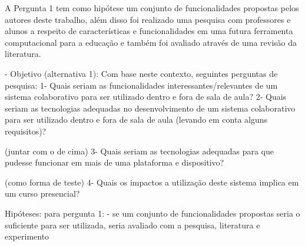 


A Pergunta 1 tem como hipótese um conjunto de funcionalidades propostas pelos autores deste trabalho, além disso foi realizado uma pesquisa com professores e alunos a respeito de características e funcionalidades em uma futura ferramenta computacional para a educação e também foi avaliado através de uma revisão da literatura.

- Objetivo (alternativa 1):
                Com base neste contexto, seguintes perguntas de pesquisa:
                    1- Quais seriam as funcionalidades interessantes/relevantes de um sistema colaborativo para ser utilizado dentro e fora de sala de aula?
                    2- Quais seriam as tecnologias adequadas no desenvolvimento de um sistema colaborativo para ser utilizado dentro e fora de sala de aula (levando em conta alguns requisitos)?

                    (juntar com o de cima) 3- Quais seriam as tecnologias adequadas para que pudesse funcionar em mais de uma plataforma e dispositivo?

                    (como forma de teste) 4- Quais os impactos a utilização deste sistema implica em um curso presencial?

                    Hipóteses:
                    para pergunta 1:
                        - se um conjunto de funcionalidades propostas seria o suficiente para ser utilizada, seria avaliado com a pesquisa, literatura e experimento


